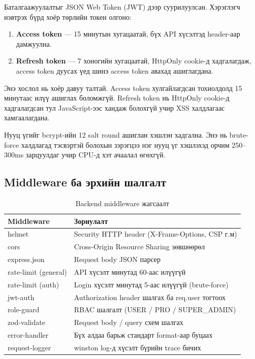 Баталгаажуулалтыг JSON Web Token (JWT) дээр суурилуулсан. Хэрэглэгч нэвтрэх бүрд хоёр төрлийн токен олгоно:

\begin{enumerate}
\item \textbf{Access token} --- 15 минутын хугацаатай, бүх API хүсэлтэд  header-аар дамжуулна.
\item \textbf{Refresh token} --- 7 хоногийн хугацаатай, HttpOnly cookie-д хадгалагдаж, access token дуусах үед шинэ access token авахад ашиглагдана.
\end{enumerate}

Энэ хослол нь хоёр давуу талтай. Access token хулгайлагдсан тохиолдолд 15 минутаас илүү ашиглах боломжгүй. Refresh token нь HttpOnly cookie-д хадгалагдсан тул JavaScript-ээс хандаж болохгүй учир XSS халдлагаас хамгаалагдана.

Нууц үгийг bcrypt-ийн 12 salt round ашиглан хэшлэн хадгална. Энэ нь brute-force халдлагад тэсвэртэй болохын зэрэгцээ нэг нууц үг хэшлэхэд орчим 250--300ms зарцуулдаг учир CPU-д хэт ачаалал өгөхгүй.

\subsection{Middleware ба эрхийн шалгалт}

\begin{table}[H]
\centering
\label{tab:middleware}
\begin{tabular}{|l|p{8.5cm}|}
\hline
\textbf{Middleware} & \textbf{Зориулалт} \\
\hline
helmet & Security HTTP header (X-Frame-Options, CSP г.м) \\
\hline
cors & Cross-Origin Resource Sharing зөвшөөрөл \\
\hline
express.json & Request body JSON парсер \\
\hline
rate-limit (general) & API хүсэлт минутад 60-аас илүүгүй \\
\hline
rate-limit (auth) & Login хүсэлт минутад 5-аас илүүгүй (brute-force) \\
\hline
jwt-auth & Authorization header шалгах ба req.user тогтоох \\
\hline
role-guard & RBAC шалгалт (USER / PRO / SUPER\_ADMIN) \\
\hline
zod-validate & Request body / query схем шалгах \\
\hline
error-handler & Бүх алдаа барьж стандарт format-аар буцаах \\
\hline
request-logger & winston log-д хүсэлт бүрийн trace бичих \\
\hline
\end{tabular}
\caption{Backend middleware жагсаалт}
\end{table}

